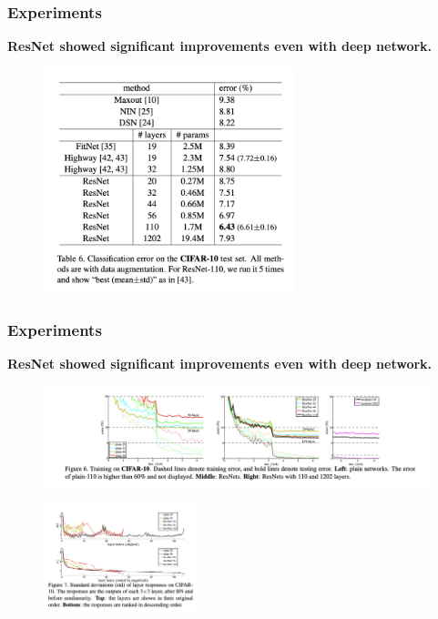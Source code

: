 \documentclass[
	11pt, %
]{beamer}
\begin{document}
\begin{frame}
	\frametitle{Experiments}

	\textbf{ResNet showed significant improvements even with deep network.}

	\begin{figure}
		\centering
		\includegraphics[width=0.65\textwidth]{./images/Screenshot 2025-05-20 at 0.40.29.png}
	\end{figure}
\end{frame}


\begin{frame}
	\frametitle{Experiments}

	\textbf{ResNet showed significant improvements even with deep network.}

	\begin{figure}
		\centering
		\includegraphics[width=\textwidth]{./images/Screenshot 2025-05-20 at 0.41.53.png}
	\end{figure}

	\begin{figure}
		\centering
		\includegraphics[width=0.40\textwidth]{./images/Screenshot 2025-05-20 at 0.42.53.png}
	\end{figure}
\end{frame}
\end{document}
